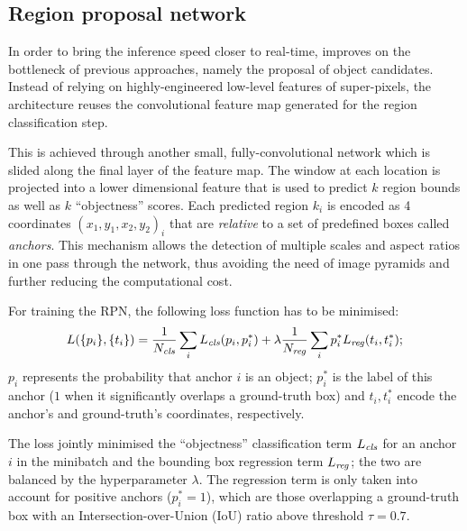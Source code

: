 	\subsection{Region proposal network}\label{sec:frcnn_rpn}
		In order to bring the inference speed closer to real-time, \FRCNN{} improves on the bottleneck of previous approaches, namely the proposal of object candidates. Instead of relying on highly-engineered low-level features of super-pixels, the architecture reuses the convolutional feature map generated for the region classification step.

		This is achieved through another small, fully-convolutional network which is slided along the final layer of the feature map. The window at each location is projected into a lower dimensional feature that is used to predict \(k\) region bounds as well as \(k\) ``objectness'' scores. Each predicted region \(k_i\) is encoded as 4  coordinates \((x_1, y_1, x_2, y_2)_i\) that are \emph{relative} to a set of predefined boxes called \emph{anchors}. This mechanism allows the detection of multiple scales and aspect ratios in one pass through the network, thus avoiding the need of image pyramids and further reducing the computational cost.

		For training the RPN, the following loss function has to be minimised:
		\begin{equation}\label{eq:rpn_loss}
		L(\{p_i\}, \{t_i\}) = \frac{1}{N_{\mathit{cls}}}\sum_i L_{\mathit{cls}}(p_i, p^{*}_i) + \lambda\frac{1}{N_{\mathit{reg}}}\sum_i  p^{*}_i L_{\mathit{reg}}(t_i, t^{*}_i);
		\end{equation}
		\(p_i\) represents the probability that anchor \(i\) is an object; \(p^{*}_i\) is the label of this anchor (\(1\) when it significantly overlaps a ground-truth box) and \(t_i, t^{*}_i\) encode the anchor's and ground-truth's coordinates, respectively.

		The loss jointly minimised  the ``objectness'' classification term \(L_{\mathit{cls}}\) for an anchor \(i\) in the minibatch and the bounding box regression term \(L_{\mathit{reg}}\); the two are balanced by the hyperparameter \(\lambda\). The regression term is only taken into account for positive anchors (\(p^{*}_i = 1\)), which are those overlapping a ground-truth box with an Intersection-over-Union (IoU) ratio above threshold \(\tau = 0.7\).


